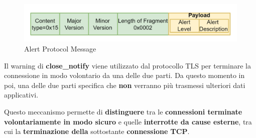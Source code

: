 \begin{figure}[h]
    \centering
    \includegraphics{image/tlsalert.png}
    \caption{Alert Protocol Message}
    \label{fig:tlsalert}
\end{figure}
\begin{remark}
Il warning di \textbf{close\_notify} viene utilizzato dal protocollo TLS per terminare la connessione in modo volontario da una delle due parti. Da questo momento in poi, una delle due parti specifica che \textbf{non} verranno più trasmessi ulteriori dati applicativi.
\end{remark}
Questo meccanismo permette di \textbf{distinguere} tra le \textbf{connessioni terminate volontariamente in modo sicuro}  e quelle \textbf{interrotte da cause esterne}, tra cui la \textbf{terminazione della} sottostante \textbf{connessione TCP}.
